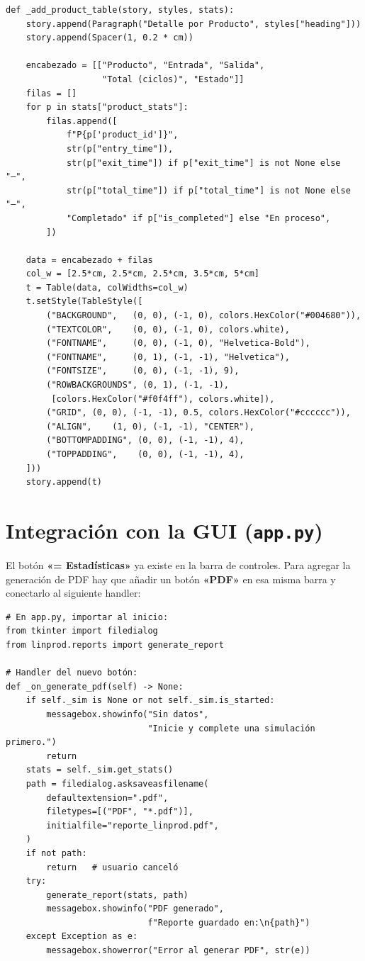 \documentclass[12pt,letterpaper]{article}
\begin{document}
\begin{lstlisting}
def _add_product_table(story, styles, stats):
    story.append(Paragraph("Detalle por Producto", styles["heading"]))
    story.append(Spacer(1, 0.2 * cm))

    encabezado = [["Producto", "Entrada", "Salida",
                   "Total (ciclos)", "Estado"]]
    filas = []
    for p in stats["product_stats"]:
        filas.append([
            f"P{p['product_id']}",
            str(p["entry_time"]),
            str(p["exit_time"]) if p["exit_time"] is not None else "—",
            str(p["total_time"]) if p["total_time"] is not None else "—",
            "Completado" if p["is_completed"] else "En proceso",
        ])

    data = encabezado + filas
    col_w = [2.5*cm, 2.5*cm, 2.5*cm, 3.5*cm, 5*cm]
    t = Table(data, colWidths=col_w)
    t.setStyle(TableStyle([
        ("BACKGROUND",   (0, 0), (-1, 0), colors.HexColor("#004680")),
        ("TEXTCOLOR",    (0, 0), (-1, 0), colors.white),
        ("FONTNAME",     (0, 0), (-1, 0), "Helvetica-Bold"),
        ("FONTNAME",     (0, 1), (-1, -1), "Helvetica"),
        ("FONTSIZE",     (0, 0), (-1, -1), 9),
        ("ROWBACKGROUNDS", (0, 1), (-1, -1),
         [colors.HexColor("#f0f4ff"), colors.white]),
        ("GRID", (0, 0), (-1, -1), 0.5, colors.HexColor("#cccccc")),
        ("ALIGN",    (1, 0), (-1, -1), "CENTER"),
        ("BOTTOMPADDING", (0, 0), (-1, -1), 4),
        ("TOPPADDING",    (0, 0), (-1, -1), 4),
    ]))
    story.append(t)
\end{lstlisting}

\section{Integración con la GUI (\texttt{app.py})}

El botón \textbf{«= Estadísticas»} ya existe en la barra de controles.
Para agregar la generación de PDF hay que añadir un botón \textbf{«PDF»}
en esa misma barra y conectarlo al siguiente handler:

\begin{lstlisting}
# En app.py, importar al inicio:
from tkinter import filedialog
from linprod.reports import generate_report

# Handler del nuevo botón:
def _on_generate_pdf(self) -> None:
    if self._sim is None or not self._sim.is_started:
        messagebox.showinfo("Sin datos",
                            "Inicie y complete una simulación primero.")
        return
    stats = self._sim.get_stats()
    path = filedialog.asksaveasfilename(
        defaultextension=".pdf",
        filetypes=[("PDF", "*.pdf")],
        initialfile="reporte_linprod.pdf",
    )
    if not path:
        return   # usuario canceló
    try:
        generate_report(stats, path)
        messagebox.showinfo("PDF generado",
                            f"Reporte guardado en:\n{path}")
    except Exception as e:
        messagebox.showerror("Error al generar PDF", str(e))
\end{lstlisting}
\end{document}
